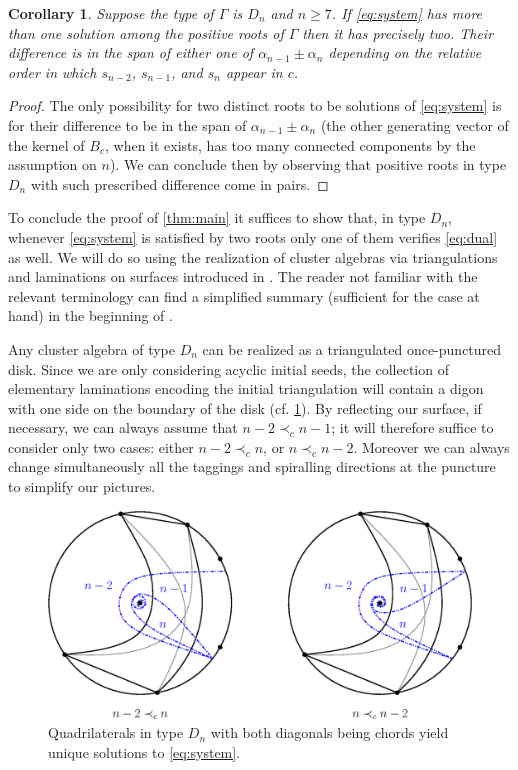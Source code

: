 \documentclass[11pt]{amsart}
\newtheorem{corollary}[theorem]{Corollary}
\theoremstyle{definition}
\numberwithin{equation}{section}
\numberwithin{figure}{section}
\begin{document}
  \begin{corollary}
    \label{cor:kernel-Dn}
    Suppose the type of $\Gamma$ is $D_n$ and $n\geq 7$.
    If \cref{eq:system} has more than one solution among the positive roots of $\Gamma$ then it has precisely two.
    Their difference is in the span of either one of $\alpha_{n-1}\pm\alpha_n$ depending on the relative order in which $s_{n-2}$, $s_{n-1}$, and $s_n$ appear in $c$.
  \end{corollary}
  \begin{proof}
    The only possibility for two distinct roots to be solutions of \cref{eq:system} is for their difference to be in the span of $\alpha_{n-1}\pm\alpha_n$ (the other generating vector of the kernel of $B_c$, when it exists, has too many connected components by the assumption on $n$).
    We can conclude then by observing that positive roots in type $D_n$ with such prescribed difference come in pairs.
  \end{proof}

  To conclude the proof of \cref{thm:main} it suffices to show that, in type $D_n$, whenever \cref{eq:system} is satisfied by two roots only one of them verifies \cref{eq:dual} as well.
  We will do so using the realization of cluster algebras via triangulations and laminations on surfaces introduced in \cite{FST08,FT12}.
  The reader not familiar with the relevant terminology can find a simplified summary (sufficient for the case at hand) in the beginning of \cite[Section 4.1]{NS14}.

  Any cluster algebra of type $D_n$ can be realized as a triangulated once-punctured disk.
  Since we are only considering acyclic initial seeds, the collection of elementary laminations encoding the initial triangulation will contain a digon with one side on the boundary of the disk (cf. \cref{fig:D_n-roots}).
  By reflecting our surface, if necessary, we can always assume that $n-2 \prec_c n-1$; it will therefore suffice to consider only two cases: either $n-2 \prec_c n$, or $n \prec_c n-2$.
  Moreover we can always change simultaneously all the taggings and spiralling directions at the puncture to simplify our pictures.

  \begin{figure}
    \begin{center}
      \includegraphics[scale=0.7]{D_n-roots.eps}
    \end{center}
    \caption{Quadrilaterals in type $D_n$ with both diagonals being chords yield unique solutions to \cref{eq:system}.}
    \label{fig:D_n-roots}
  \end{figure}
\end{document}
